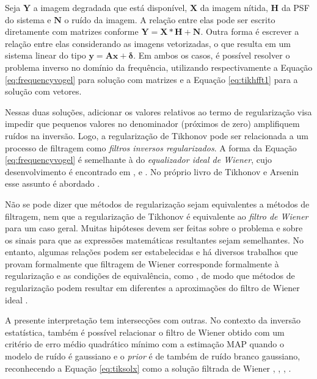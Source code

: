 Seja $\mathbf{Y}$ a imagem degradada que está disponível, $\mathbf{X}$ da imagem nítida, $\mathbf{H}$ da PSF do sistema e $\mathbf{N}$ o ruído da imagem. A relação entre elas pode ser escrito diretamente com matrizes conforme $\mathbf{Y} = \mathbf{X} * \mathbf{H} + \mathbf{N}$. Outra forma é escrever a relação entre elas considerando as imagens vetorizadas, o que resulta em um sistema linear do tipo $\mathbf{y} = \mathbf{A}\mathbf{x} + \bm{\delta}$. Em ambos os casos, é possível resolver o problema inverso no domínio da frequência, utilizando respectivamente a Equação \eqref{eq:frequencyvogel} para solução com matrizes e a Equação \eqref{eq:tikhfft1} para a solução com vetores. 


Nessas duas soluções, adicionar os valores relativos ao termo de regularização visa impedir que pequenos valores no denominador (próximos de zero) amplifiquem ruídos na inversão. Logo, a regularização de Tikhonov pode ser relacionada a um processo de filtragem \cite{Ribeiro2015} como \textit{filtros inversos regularizados}. A forma da Equação \eqref{eq:frequencyvogel} é semelhante à do \textit{equalizador ideal de Wiener}, cujo desenvolvimento é encontrado  em \cite[págs. 547-8]{press1992numerical}, \cite[págs. 402-3]{Thibaut2005} e \cite[págs. 191-2, 197-8, 425-6]{vaseghi2000advanced}. No próprio livro de Tikhonov e Arsenin esse assunto é abordado \cite[págs. 149-52]{tikhonov1977solutions}.

Não se pode dizer que métodos de regularização sejam equivalentes a métodos de filtragem, nem que a regularização de Tikhonov é equivalente ao \textit{filtro de Wiener} para um caso geral. Muitas hipóteses devem ser feitas sobre o problema e sobre os sinais para que as expressões matemáticas resultantes sejam semelhantes. No entanto, algumas relações podem ser estabelecidas e há diversos trabalhos que provam formalmente que filtragem de Wiener corresponde formalmente à regularização \cite{Anderssen1995} e as condições de equivalência, como \cite{Anderssen1981,Murli1999, Sjberg2012}, de modo que métodos de regularização podem resultar em diferentes a aproximações do filtro de Wiener ideal \cite[págs. 125-6]{Hansen1998}. 

A presente interpretação tem intersecções com outras. No contexto da inversão estatística, também é possível relacionar o filtro de Wiener obtido com um critério de erro médio quadrático mínimo com a estimação MAP quando o modelo de ruído é gaussiano e o \textit{prior} é de também de ruído branco gaussiano, reconhecendo a Equação \eqref{eq:tiksolx} como a solução filtrada de Wiener \cite[pág. 150]{calvetti2007introduction}, \cite{Gribonval2011}, \cite[pág. 79]{kaipio2005statistical}, \cite{Thibaut2005}. 

